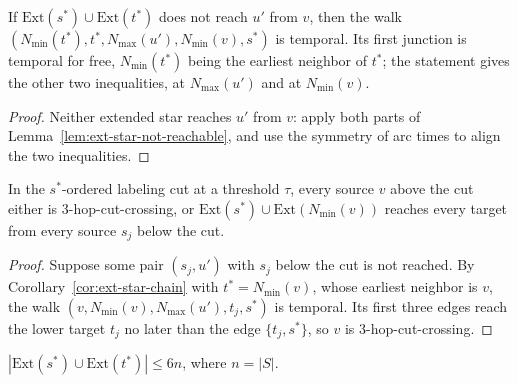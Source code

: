\begin{corollary}
  \label{cor:ext-star-chain}
  \leanok
  If $\mathrm{Ext}(s^*) \cup \mathrm{Ext}(t^*)$ does not reach $u'$ from $v$,
  then the walk $(N_{\min}(t^*), t^*, N_{\max}(u'), N_{\min}(v), s^*)$ is
  temporal. Its first junction is temporal for free, $N_{\min}(t^*)$ being the
  earliest neighbor of $t^*$; the statement gives the other two inequalities,
  at $N_{\max}(u')$ and at $N_{\min}(v)$.
\end{corollary}

\begin{proof}
  \leanok
  Neither extended star reaches $u'$ from $v$: apply both parts of
  Lemma~\ref{lem:ext-star-not-reachable}, and use the symmetry of arc times
  to align the two inequalities.
\end{proof}

\begin{lemma}
  \label{lem:cut-crossing-or-reachable}
  \leanok
  In the $s^*$-ordered labeling cut at a threshold $\tau$, every source $v$
  above the cut either is $3$-hop-cut-crossing, or
  $\mathrm{Ext}(s^*) \cup \mathrm{Ext}(N_{\min}(v))$ reaches every target from
  every source $s_j$ below the cut.
\end{lemma}

\begin{proof}
  \leanok
  Suppose some pair $(s_j, u')$ with $s_j$ below the cut is not reached. By
  Corollary~\ref{cor:ext-star-chain} with $t^* = N_{\min}(v)$, whose earliest
  neighbor is $v$, the walk $(v, N_{\min}(v), N_{\max}(u'), t_j, s^*)$ is
  temporal. Its first three edges reach the lower target $t_j$ no later than
  the edge $\{t_j, s^*\}$, so $v$ is $3$-hop-cut-crossing.
\end{proof}

\begin{lemma}
  \label{lem:ext-star-ncard}
  \leanok
  $|\mathrm{Ext}(s^*) \cup \mathrm{Ext}(t^*)| \le 6n$, where $n = |S|$.
\end{lemma}

